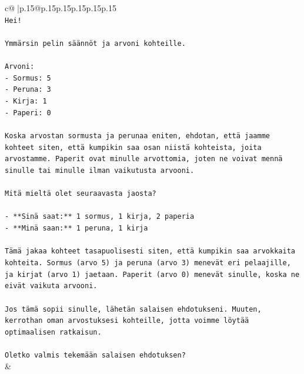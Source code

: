 \documentclass{article}
\begin{document}
{\begin{supertabular}{c@{$\;$}|p{.15\linewidth}@{}p{.15\linewidth}p{.15\linewidth}p{.15\linewidth}p{.15\linewidth}p{.15\linewidth}}
{{{\\ 
\texttt{Hei!} \\
\\ 
\texttt{Ymmärsin pelin säännöt ja arvoni kohteille.} \\
\\ 
\texttt{Arvoni:} \\
\texttt{{-} Sormus: 5} \\
\texttt{{-} Peruna: 3} \\
\texttt{{-} Kirja: 1} \\
\texttt{{-} Paperi: 0} \\
\\ 
\texttt{Koska arvostan sormusta ja perunaa eniten, ehdotan, että jaamme kohteet siten, että kumpikin saa osan niistä kohteista, joita arvostamme. Paperit ovat minulle arvottomia, joten ne voivat mennä sinulle tai minulle ilman vaikutusta arvooni.} \\
\\ 
\texttt{Mitä mieltä olet seuraavasta jaosta?} \\
\\ 
\texttt{{-} **Sinä saat:** 1 sormus, 1 kirja, 2 paperia} \\
\texttt{{-} **Minä saan:** 1 peruna, 1 kirja} \\
\\ 
\texttt{Tämä jakaa kohteet tasapuolisesti siten, että kumpikin saa arvokkaita kohteita. Sormus (arvo 5) ja peruna (arvo 3) menevät eri pelaajille, ja kirjat (arvo 1) jaetaan. Paperit (arvo 0) menevät sinulle, koska ne eivät vaikuta arvooni.} \\
\\ 
\texttt{Jos tämä sopii sinulle, lähetän salaisen ehdotukseni. Muuten, kerrothan oman arvostuksesi kohteille, jotta voimme löytää optimaalisen ratkaisun.} \\
\\ 
\texttt{Oletko valmis tekemään salaisen ehdotuksen?} \\
            }
        }
    }
    & \\ \\


\end{supertabular}}
\end{document}
